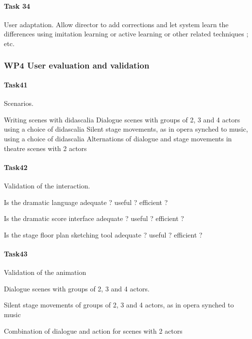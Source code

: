 
\paragraph{Task 34} User adaptation.
Allow director to add corrections and let system learn the differences using imitation learning or active learning or other related techniques ; etc.


\subsubsection{WP4 User evaluation and validation}

\paragraph{Task41} Scenarios.

Writing scenes with didascalia 
Dialogue scenes with groups of 2, 3 and 4 actors using a choice of didascalia
Silent stage movements, as in opera synched to music, using a choice of didascalia
Alternations of dialogue and stage movements in theatre scenes with 2 actors

\paragraph{Task42} Validation of the interaction.

Is the dramatic language adequate ? useful ?  efficient  ? 

Is the dramatic score interface  adequate ? useful ?  efficient  ? 

Is the stage floor plan sketching tool adequate ? useful ?  efficient  ? 

\paragraph{Task43} Validation of the animation

Dialogue scenes  with groups of 2, 3 and 4 actors.

Silent stage movements of groups of 2, 3 and 4 actors, as in opera synched to music

Combination of dialogue and action for scenes with 2 actors


\endinput

